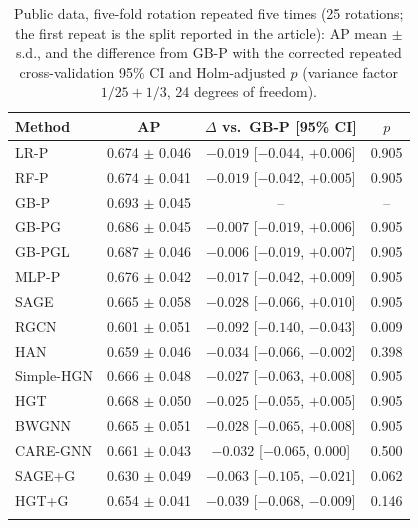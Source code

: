 \begin{table}[h]
\caption{Public data, five-fold rotation repeated five times (25 rotations; the first repeat is the split reported in the article): AP mean $\pm$ s.d., and the difference from GB-P with the corrected repeated cross-validation 95\% CI and Holm-adjusted $p$ (variance factor $1/25 + 1/3$, 24 degrees of freedom).}\label{tab:kaggle_repeated}
\footnotesize
\begin{tabular}{@{}lccc@{}}
\toprule
Method & AP & $\Delta$ vs.\ GB-P [95\% CI] & $p$ \\
\midrule
LR-P & 0.674 $\pm$ 0.046 & $-0.019$ [$-0.044$, $+0.006$] & 0.905 \\
RF-P & 0.674 $\pm$ 0.041 & $-0.019$ [$-0.042$, $+0.005$] & 0.905 \\
GB-P & 0.693 $\pm$ 0.045 & -- & -- \\
GB-PG & 0.686 $\pm$ 0.045 & $-0.007$ [$-0.019$, $+0.006$] & 0.905 \\
GB-PGL & 0.687 $\pm$ 0.046 & $-0.006$ [$-0.019$, $+0.007$] & 0.905 \\
MLP-P & 0.676 $\pm$ 0.042 & $-0.017$ [$-0.042$, $+0.009$] & 0.905 \\
SAGE & 0.665 $\pm$ 0.058 & $-0.028$ [$-0.066$, $+0.010$] & 0.905 \\
RGCN & 0.601 $\pm$ 0.051 & $-0.092$ [$-0.140$, $-0.043$] & 0.009 \\
HAN & 0.659 $\pm$ 0.046 & $-0.034$ [$-0.066$, $-0.002$] & 0.398 \\
Simple-HGN & 0.666 $\pm$ 0.048 & $-0.027$ [$-0.063$, $+0.008$] & 0.905 \\
HGT & 0.668 $\pm$ 0.050 & $-0.025$ [$-0.055$, $+0.005$] & 0.905 \\
BWGNN & 0.665 $\pm$ 0.051 & $-0.028$ [$-0.065$, $+0.008$] & 0.905 \\
CARE-GNN & 0.661 $\pm$ 0.043 & $-0.032$ [$-0.065$, $0.000$] & 0.500 \\
SAGE+G & 0.630 $\pm$ 0.049 & $-0.063$ [$-0.105$, $-0.021$] & 0.062 \\
HGT+G & 0.654 $\pm$ 0.041 & $-0.039$ [$-0.068$, $-0.009$] & 0.146 \\
\botrule
\end{tabular}
\end{table}